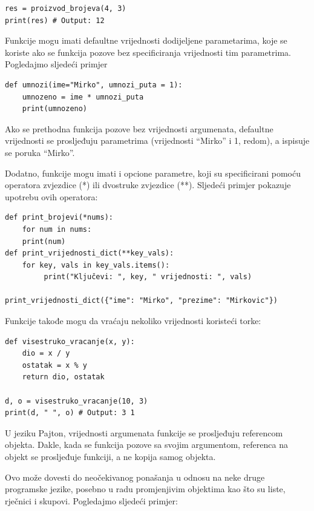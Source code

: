 \begin{verbatim}
res = proizvod_brojeva(4, 3)
print(res) # Output: 12
\end{verbatim}

Funkcije mogu imati defaultne vrijednosti dodijeljene parametarima, koje se koriste ako se funkcija pozove bez specificiranja vrijednosti tim parametrima.  Pogledajmo sljedeći primjer 
\begin{verbatim}
def umnozi(ime="Mirko", umnozi_puta = 1):
    umnozeno = ime * umnozi_puta
    print(umnozeno)
\end{verbatim}
Ako se prethodna funkcija pozove bez   vrijednosti argumenata, defaultne vrijednosti se prosljeđuju parametrima (vrijednosti ``Mirko'' i 1, redom), a ispisuje se poruka ``Mirko''. 

Dodatno, funkcije mogu imati i opcione parametre, koji su specificirani pomoću operatora zvjezdice (*) ili dvostruke zvjezdice (**). Sljedeći primjer pokazuje upotrebu ovih operatora:
\begin{verbatim}
def print_brojevi(*nums):
    for num in nums:
    print(num)
def print_vrijednosti_dict(**key_vals):
    for key, vals in key_vals.items():
         print("Ključevi: ", key, " vrijednosti: ", vals)    

print_vrijednosti_dict({"ime": "Mirko", "prezime": "Mirkovic"})
\end{verbatim}

Funkcije takođe mogu da vraćaju nekoliko vrijednosti koristeći torke:

\begin{verbatim}
def visestruko_vracanje(x, y):
    dio = x / y
    ostatak = x % y
    return dio, ostatak

d, o = visestruko_vracanje(10, 3)
print(d, " ", o) # Output: 3 1
\end{verbatim}


U jeziku Pajton, vrijednosti argumenata funkcije se prosljeđuju referencom objekta. Dakle, kada se funkcija pozove sa svojim argumentom, referenca na objekt se prosljeđuje funkciji, a ne kopija samog objekta. %

Ovo može dovesti do   neočekivanog ponašanja u odnosu na neke druge programske jezike, posebno u radu promjenjivim objektima kao što su liste, rječnici i skupovi. Pogledajmo sljedeći primjer:

